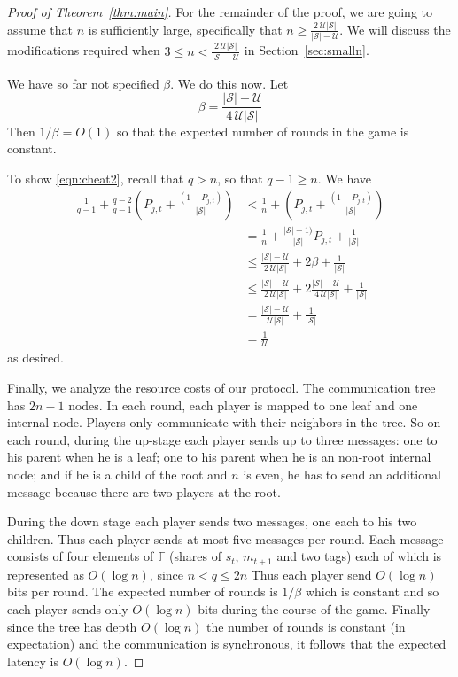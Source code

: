 \documentclass[12pt]{article}
\theoremstyle{definition}
\newcommand{\U}{\mathcal{U}}
\renewcommand{\S}{\mathcal{S}}
\newcommand{\F}{\mathbb{F}}
\newcommand{\Pjt}{P_{j,t}}
\begin{document}
\begin{proof}[Proof of Theorem~\ref{thm:main}]
For the remainder of the proof, we are going to assume that $n$ is 
sufficiently large, specifically that $n \ge \frac{2\,\U |\S|}{|\S|-\U}$. 
We will discuss the modifications required when 
$3\le n <  \frac{2\,\U |\S|}{|\S|-\U}$ in Section~\ref{sec:smalln}. 

We have so far not specified $\beta$. We do this now.
Let 
\[
\beta = \frac{|\S|-\U}{4\,\U |\S|}
\]
Then $1/\beta =O(1)$ so that the expected number of rounds in the game 
is constant. 

To show \eqref{eqn:cheat2}, recall that $q> n$, so that $q-1 \ge n$.
We have
\begin{align*} 
\frac{1}{q-1}+ \frac{q-2}{q-1}\left(\Pjt + \frac{(1-\Pjt)}{|\S|}\right)
&< \frac{1}{n} + \left(\Pjt + \frac{(1-\Pjt)}{|\S|}\right)
\\&=\frac{1}{n} + \frac{|\S|-1)}{|\S|}\Pjt + \frac1{|\S|}
\\&\le \frac{|\S|-\U}{2\,\U |\S|} + 2\beta  + \frac1{|\S|}
\\&\le \frac{|\S|-\U}{2\,\U |\S|} + 2\frac{|\S|-\U}{4\,\U |\S|}  + 
\frac1{|\S|}
\\&= \frac{|\S|-\U}{\U |\S|} + \frac1{|\S|}
\\&= \frac1{\U}
\end{align*}
as desired.
\smallskip

Finally, we analyze the resource costs of our protocol.  The communication
tree has $2n-1$ nodes. In each round, each player is mapped to one leaf and 
one internal node.  Players only communicate with their neighbors in
the tree. So on each round, during the up-stage each player sends up to three 
messages: one to his parent when he is a leaf; one to his parent when he is 
an non-root internal node; and if he is a child of the root and $n$ is even, 
he has to send an additional message because there are two players at the 
root.

During the down stage each player sends two messages, one each 
to his two children. Thus each player sends at most five messages per round.
Each message consists of four elements of $\F$ (shares of $s_t$, $m_{t+1}$ and 
two tags) each of which is represented as $O(\log n)$, since $n<q\le 2n$
Thus each player send $O(\log n)$ bits per round. 
The expected number of rounds is $1/\beta$ which is constant 
and so each player sends only $O(\log n)$ bits 
during the course of the game. Finally since the tree has depth
$O(\log n)$ the number of rounds is constant (in expectation) and the 
communication is synchronous, it follows that the expected
latency is $O(\log n)$.
\end{proof}
\end{document}
